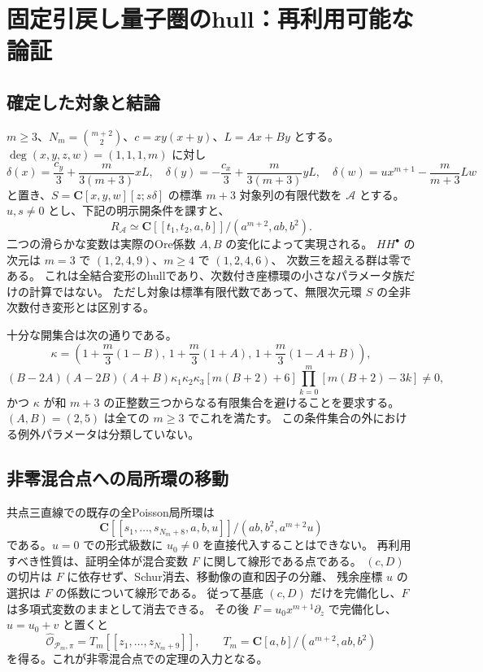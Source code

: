 \section{固定引戻し量子圏のhull：再利用可能な論証}
\label{notes:pullback-fixed-hulls-v37}

\subsection{確定した対象と結論}

$m\ge3$、$N_m=\binom{m+2}{2}$、$c=xy(x+y)$、$L=Ax+By$ とする。
$\deg(x,y,z,w)=(1,1,1,m)$ に対し
\[
 \delta(x)=\frac{c_y}{3}+\frac{m}{3(m+3)}xL,\quad
 \delta(y)=-\frac{c_x}{3}+\frac{m}{3(m+3)}yL,\quad
 \delta(w)=u x^{m+1}-\frac{m}{m+3}Lw
\]
と置き、$S=\mathbf C[x,y,w][z;s\delta]$ の標準 $m+3$ 対象列の有限代数を
$\mathcal A$ とする。$u,s\ne0$ とし、下記の明示開条件を課すと、
\[
 R_{\mathcal A}\simeq
 \mathbf C[[t_1,t_2,a,b]]/(a^{m+2},ab,b^2).
\]
二つの滑らかな変数は実際のOre係数 $A,B$ の変化によって実現される。
$HH^\bullet$ の次元は $m=3$ で $(1,2,4,9)$、$m\ge4$ で $(1,2,4,6)$、
次数三を超える群は零である。
これは全結合変形のhullであり、次数付き座標環の小さなパラメータ族だけの計算ではない。
ただし対象は標準有限代数であって、無限次元環 $S$ の全非次数付き変形とは区別する。

十分な開集合は次の通りである。
\[
 \kappa=\left(1+\frac m3(1-B),\,1+\frac m3(1+A),\,
                  1+\frac m3(1-A+B)\right),
\]
\[
 (B-2A)(A-2B)(A+B)\kappa_1\kappa_2\kappa_3
 [m(B+2)+6]\prod_{k=0}^{m}[m(B+2)-3k]\ne0,
\]
かつ $\kappa$ が和 $m+3$ の正整数三つからなる有限集合を避けることを要求する。
$(A,B)=(2,5)$ は全ての $m\ge3$ でこれを満たす。
この条件集合の外における例外パラメータは分類していない。

\subsection{非零混合点への局所環の移動}

共点三直線での既存の全Poisson局所環は
\[
 \mathbf C[[s_1,\ldots,s_{N_m+8},a,b,u]]/(ab,b^2,a^{m+2}u)
\]
である。$u=0$ での形式級数に $u_0\ne0$ を直接代入することはできない。
再利用すべき性質は、証明全体が混合変数 $F$ に関して線形である点である。
$(c,D)$ の切片は $F$ に依存せず、Schur消去、移動像の直和因子の分離、
残余座標 $u$ の選択は $F$ の係数について線形である。
従って基底 $(c,D)$ だけを完備化し、$F$ は多項式変数のままとして消去できる。
その後 $F=u_0x^{m+1}\partial_z$ で完備化し、$u=u_0+v$ と置くと
\[
 \widehat{\mathcal O}_{\mathscr P_m,\pi}
 =T_m[[z_1,\ldots,z_{N_m+9}]],\qquad
 T_m=\mathbf C[a,b]/(a^{m+2},ab,b^2)
\]
を得る。これが非零混合点での定理の入力となる。

